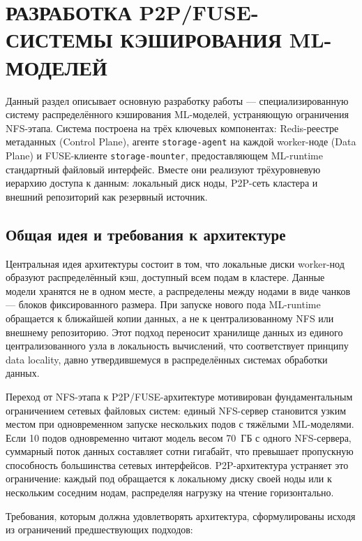 \chapter{РАЗРАБОТКА P2P/FUSE-СИСТЕМЫ КЭШИРОВАНИЯ ML-МОДЕЛЕЙ}

Данный раздел описывает основную разработку работы --- специализированную систему распределённого кэширования ML-моделей, устраняющую ограничения NFS-этапа. Система построена на трёх ключевых компонентах: Redis-реестре метаданных (Control Plane), агенте \texttt{storage-agent} на каждой worker-ноде (Data Plane) и FUSE-клиенте \texttt{storage-mounter}, предоставляющем ML-runtime стандартный файловый интерфейс. Вместе они реализуют трёхуровневую иерархию доступа к данным: локальный диск ноды, P2P-сеть кластера и внешний репозиторий как резервный источник.

\section{Общая идея и требования к архитектуре}

Центральная идея архитектуры состоит в том, что локальные диски worker-нод образуют распределённый кэш, доступный всем подам в кластере. Данные модели хранятся не в одном месте, а распределены между нодами в виде чанков --- блоков фиксированного размера. При запуске нового пода ML-runtime обращается к ближайшей копии данных, а не к централизованному NFS или внешнему репозиторию. Этот подход переносит хранилище данных из единого централизованного узла в локальность вычислений, что соответствует принципу data locality, давно утвердившемуся в распределённых системах обработки данных.

Переход от NFS-этапа к P2P/FUSE-архитектуре мотивирован фундаментальным ограничением сетевых файловых систем: единый NFS-сервер становится узким местом при одновременном запуске нескольких подов с тяжёлыми ML-моделями. Если 10 подов одновременно читают модель весом 70~ГБ с одного NFS-сервера, суммарный поток данных составляет сотни гигабайт, что превышает пропускную способность большинства сетевых интерфейсов. P2P-архитектура устраняет это ограничение: каждый под обращается к локальному диску своей ноды или к нескольким соседним нодам, распределяя нагрузку на чтение горизонтально.

Требования, которым должна удовлетворять архитектура, сформулированы исходя из ограничений предшествующих подходов:

